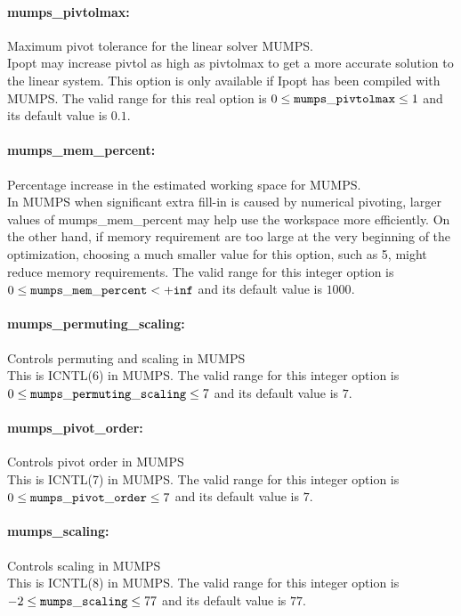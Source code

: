 \paragraph{mumps\_pivtolmax:}\label{sec:mumps_pivtolmax} Maximum pivot tolerance for the linear solver MUMPS. $\;$ \\
 Ipopt may increase pivtol as high as pivtolmax to
get a more accurate solution to the linear
system.  This option is only available if Ipopt
has been compiled with MUMPS. The valid range for this real option is 
$0 \le {\tt mumps\_pivtolmax } \le 1$
and its default value is $0.1$.


\paragraph{mumps\_mem\_percent:}\label{sec:mumps_mem_percent} Percentage increase in the estimated working space for MUMPS. $\;$ \\
 In MUMPS when significant extra fill-in is caused
by numerical pivoting, larger values of
mumps\_mem\_percent may help use the workspace
more efficiently.  On the other hand, if memory
requirement are too large at the very beginning
of the optimization, choosing a much smaller
value for this option, such as 5, might reduce
memory requirements. The valid range for this integer option is
$0 \le {\tt mumps\_mem\_percent } <  {\tt +inf}$
and its default value is $1000$.


\paragraph{mumps\_permuting\_scaling:}\label{sec:mumps_permuting_scaling} Controls permuting and scaling in MUMPS $\;$ \\
 This is ICNTL(6) in MUMPS. The valid range for this integer option is
$0 \le {\tt mumps\_permuting\_scaling } \le 7$
and its default value is $7$.


\paragraph{mumps\_pivot\_order:}\label{sec:mumps_pivot_order} Controls pivot order in MUMPS $\;$ \\
 This is ICNTL(7) in MUMPS. The valid range for this integer option is
$0 \le {\tt mumps\_pivot\_order } \le 7$
and its default value is $7$.


\paragraph{mumps\_scaling:}\label{sec:mumps_scaling} Controls scaling in MUMPS $\;$ \\
 This is ICNTL(8) in MUMPS. The valid range for this integer option is
$-2 \le {\tt mumps\_scaling } \le 77$
and its default value is $77$.


